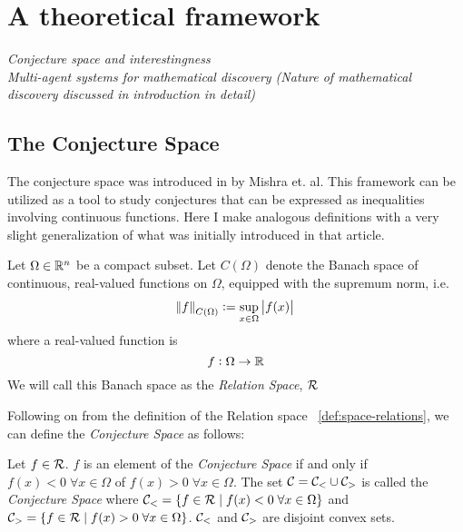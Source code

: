 \chapter{A theoretical framework}
\textit{Conjecture space and interestingness}\\
\textit{Multi-agent systems for mathematical discovery (Nature of mathematical discovery discussed in introduction in detail)}

\section{The Conjecture Space}

The conjecture space was introduced in \cite{mishraConjGen2023} by Mishra et. al. This framework can be utilized as a tool to study conjectures that can be expressed as inequalities involving continuous functions.
Here I make analogous definitions with a very slight generalization of what was initially introduced in that article.

\begin{definition}
    \label{def:space-relations}
    Let $\Omega\in\mathbb{R}^n$ be a compact subset. Let $C(\Omega)$ denote the Banach space of continuous, real-valued functions on $\Omega$, equipped with the supremum norm, i.e.
    \begin{equation*}
        \norm{f}_{C(\Omega)} := \sup_{x\in\Omega} \left|f(x)\right|    
    \end{equation*}
    where a real-valued function is
    \begin{equation*}
        f:\Omega\rightarrow\mathbb{R}
    \end{equation*}
    We will call this Banach space as the \textit{Relation Space}, $\mathcal{R}$
\end{definition}

Following on from the definition of the Relation space ~\ref{def:space-relations}, we can define the \textit{Conjecture Space} as follows:
\begin{definition}
    Let $f\in\mathcal{R}$. $f$ is an element of the \textit{Conjecture Space} if and only if $f(x) < 0 \;\forall x\in\Omega$ of $f(x) > 0 \; \forall x\in\Omega$.
    The set $\mathcal{C} = \mathcal{C}_{<}\cup\mathcal{C}_{>}$ is called the \textit{Conjecture Space} where $\mathcal{C}_{<} = \{f\in\mathcal{R}\;|\; f(x)<0\;\forall x\in\Omega\}$ and $\mathcal{C}_{>} = \{f\in\mathcal{R}\;|\;f(x)>0\;\forall x\in\Omega\}$.
    $\mathcal{C}_{<}$ and $\mathcal{C}_{>}$ are disjoint convex sets.
\end{definition}

